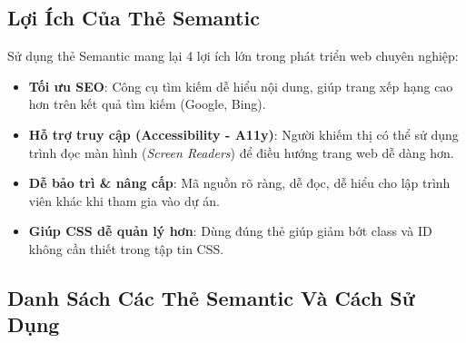 \documentclass[11pt,oneside]{book}
\begin{document}
\begin{center}
\begin{tcolorbox}
\end{tcolorbox}
\end{center}

\subsection{Lợi Ích Của Thẻ Semantic}

Sử dụng thẻ Semantic mang lại 4 lợi ích lớn trong phát triển web chuyên nghiệp:

\begin{itemize}[leftmargin=1.8em, itemsep=6pt, parsep=0pt]
    \item \textbf{Tối ưu SEO}: Công cụ tìm kiếm dễ hiểu nội dung, giúp trang xếp hạng cao hơn trên kết quả tìm kiếm (Google, Bing).
    \item \textbf{Hỗ trợ truy cập (Accessibility - A11y)}: Người khiếm thị có thể sử dụng trình đọc màn hình (\textit{Screen Readers}) để điều hướng trang web dễ dàng hơn.
    \item \textbf{Dễ bảo trì \& nâng cấp}: Mã nguồn rõ ràng, dễ đọc, dễ hiểu cho lập trình viên khác khi tham gia vào dự án.
    \item \textbf{Giúp CSS dễ quản lý hơn}: Dùng đúng thẻ giúp giảm bớt class và ID không cần thiết trong tập tin CSS.
\end{itemize}

\subsection{Danh Sách Các Thẻ Semantic Và Cách Sử Dụng}
\end{document}

